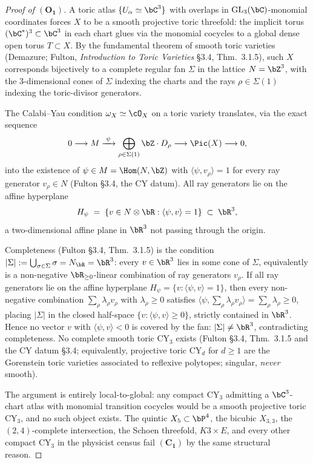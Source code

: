 \begin{proof}[Proof of $(\mathbf{O_1})$]
A toric atlas $\{U_\alpha \simeq \bC^3\}$ with overlaps in
$\mathrm{GL}_3(\bC)$-monomial coordinates forces $X$ to be a smooth
projective toric threefold: the implicit torus $(\bC^*)^3 \subset
\bC^3$ in each chart glues via the monomial cocycles to a global dense
open torus $T \subset X$. By the fundamental theorem of smooth toric
varieties (Demazure; Fulton, \emph{Introduction to Toric Varieties}
\S3.4, Thm.~3.1.5), such $X$ corresponds bijectively to a complete
regular fan $\Sigma$ in the lattice $N = \bZ^3$, with the $3$-dimensional
cones of $\Sigma$ indexing the charts and the rays $\rho \in \Sigma(1)$
indexing the toric-divisor generators.

The Calabi--Yau condition $\omega_X \simeq \cO_X$ on a toric variety
translates, via the exact sequence
\[
 0 \longrightarrow M \xrightarrow{\;\psi\;}
 \bigoplus_{\rho \in \Sigma(1)} \bZ\cdot D_\rho
 \longrightarrow \Pic(X) \longrightarrow 0,
\]
into the existence of $\psi \in M = \Hom(N, \bZ)$ with
$\langle \psi, v_\rho\rangle = 1$ for every ray generator
$v_\rho \in N$ (Fulton \S3.4, the CY datum). All ray generators lie on
the affine hyperplane
\[
 H_\psi \;=\; \{v \in N \otimes \bR : \langle \psi, v\rangle = 1\}
 \;\subset\; \bR^3,
\]
a two-dimensional affine plane in $\bR^3$ not passing through the origin.

Completeness (Fulton \S3.4, Thm.~3.1.5) is the condition
$|\Sigma| := \bigcup_{\sigma \in \Sigma} \sigma = N_\bR = \bR^3$: every
$v \in \bR^3$ lies in some cone of $\Sigma$, equivalently is a
non-negative $\bR_{\geq 0}$-linear combination of ray generators
$v_\rho$. If all ray generators lie on the affine hyperplane
$H_\psi = \{v : \langle \psi, v \rangle = 1\}$, then every non-negative
combination $\sum_\rho \lambda_\rho v_\rho$ with $\lambda_\rho \geq 0$
satisfies $\langle \psi, \sum_\rho \lambda_\rho v_\rho \rangle =
\sum_\rho \lambda_\rho \geq 0$, placing $|\Sigma|$ in the closed
half-space $\{v : \langle \psi, v\rangle \geq 0\}$, strictly contained
in $\bR^3$. Hence no vector $v$ with $\langle \psi, v\rangle < 0$ is
covered by the fan: $|\Sigma| \neq \bR^3$, contradicting completeness.
No complete smooth toric CY$_3$ exists (Fulton \S3.4, Thm.~3.1.5 and
the CY datum \S3.4; equivalently, projective toric CY$_d$ for
$d \geq 1$ are the Gorenstein toric varieties associated to reflexive
polytopes; singular, \emph{never} smooth).

The argument is entirely local-to-global: any compact CY$_3$ admitting
a $\bC^3$-chart atlas with monomial transition cocycles would be a
smooth projective toric CY$_3$, and no such object exists. The quintic
$X_5 \subset \bP^4$, the bicubic $X_{3,3}$, the $(2,4)$-complete
intersection, the Schoen threefold, $K3 \times E$, and every other
compact CY$_3$ in the physicist census fail $(\mathbf{C_1})$ by the
same structural reason.
\end{proof}

